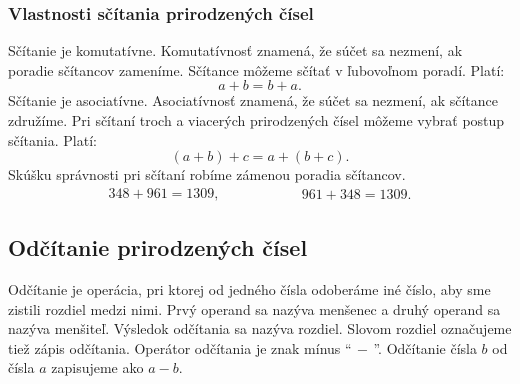 \documentclass{article}
\begin{document}
\subsubsection{Vlastnosti sčítania prirodzených čísel}

Sčítanie je komutatívne. Komutatívnosť znamená, že súčet sa nezmení, ak poradie sčítancov zameníme. Sčítance môžeme sčítať v ľubovoľnom poradí. Platí:
\[
a + b = b + a.
\]
Sčítanie je asociatívne. Asociatívnosť znamená, že súčet sa nezmení, ak sčítance združíme. Pri sčítaní troch a viacerých prirodzených čísel môžeme vybrať postup sčítania. Platí:
\[
(a + b) + c = a + (b + c).
\]
Skúšku správnosti pri sčítaní robíme zámenou poradia sčítancov.
\[
\begin{aligned}
  348 + 961 = 1309,
\end{aligned}
\hspace{5em}
\begin{aligned}
  961 + 348 = 1309.
\end{aligned}
\]

\subsection{Odčítanie prirodzených čísel}

Odčítanie je operácia, pri ktorej od jedného čísla odoberáme iné číslo, aby sme zistili rozdiel medzi nimi. Prvý operand sa nazýva menšenec a druhý operand sa nazýva menšiteľ. Výsledok odčítania sa nazýva rozdiel. Slovom rozdiel označujeme tiež zápis odčítania. Operátor odčítania je znak mínus \enquote{\(\, - \,\)}. Odčítanie čísla \(b\) od čísla \(a\) zapisujeme ako \(a - b\).
\end{document}
